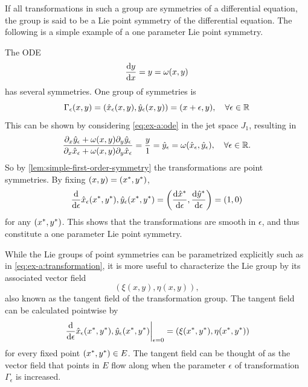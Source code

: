 If all transformations in such a group are symmetries of a differential equation, the group is said to be a Lie point symmetry of the differential equation.
The following is a simple example of a one parameter Lie point symmetry.
\begin{exmp}
  The ODE
  \begin{equation} \label{eq:ex-a:ode}
    \diff{y}{x} = y = \omega(x, y)
  \end{equation}
  has several symmetries.
  One group of symmetries is
  \begin{equation} \label{eq:ex-a:transformation}
    \Gamma_\epsilon(x,y) =
    \left(\hat{x}_\epsilon(x,y), \hat{y}_\epsilon(x,y)\right) =
    \left(x + \epsilon, y\right), \quad
    \forall \epsilon \in \reals
  \end{equation}
  This can be shown by considering \cref{eq:ex-a:ode} in the jet space \(J_1\), resulting in
  \begin{equation*}
    \frac{\partial_x \hat{y}_\epsilon + \omega(x,y) \partial_y \hat{y}_\epsilon}{\partial_x \hat{x}_\epsilon + \omega(x,y) \partial_y \hat{x}_\epsilon} =
    \frac{y}{1} =
    \hat{y}_\epsilon =
    \omega(\hat{x}_\epsilon,\hat{y}_\epsilon), \quad
    \forall \epsilon \in \mathbb{R}.
  \end{equation*}
  So by \cref{lem:simple-first-order-symmetry} the transformations are point symmetries.
  By fixing \(\left(x,y\right)=\left(\fixed{x},\fixed{y}\right)\),
  \begin{equation*}
    \diff*{\hat{x}_\epsilon(\fixed{x},\fixed{y}), \hat{y}_\epsilon(\fixed{x},\fixed{y})}{\epsilon} =
    \left(\diff{\fixed{\hat{x}}}{\epsilon}, \diff{\fixed{\hat{y}}}{\epsilon}\right) =
    \left(1,0\right)
  \end{equation*}
  for any \(\left(\fixed{x},\fixed{y}\right)\).
  This shows that the transformations are smooth in \(\epsilon\), and thus constitute a one parameter Lie point symmetry.
\end{exmp}
While the Lie groups of point symmetries can be parametrized explicitly such as in \cref{eq:ex-a:transformation}, it is more useful to characterize the Lie group by its associated vector field
\begin{equation*}
  \left(\xi(x,y), \eta(x,y)\right),
\end{equation*}
also known as the tangent field of the transformation group.
The tangent field can be calculated pointwise by 
\begin{equation*}
  \eval{\diff*{\hat{x}_\epsilon(\fixed{x},\fixed{y}), \hat{y}_\epsilon(\fixed{x},\fixed{y})}{\epsilon}}_{\epsilon=0} = \left(\xi(\fixed{x},\fixed{y}), \eta(\fixed{x},\fixed{y})\right)
\end{equation*}
for every fixed point \(\left(\fixed{x},\fixed{y}\right) \in E\).
The tangent field can be thought of as the vector field that points in \(E\) flow along when the parameter \(\epsilon\) of transformation \(\Gamma_\epsilon\) is increased.

